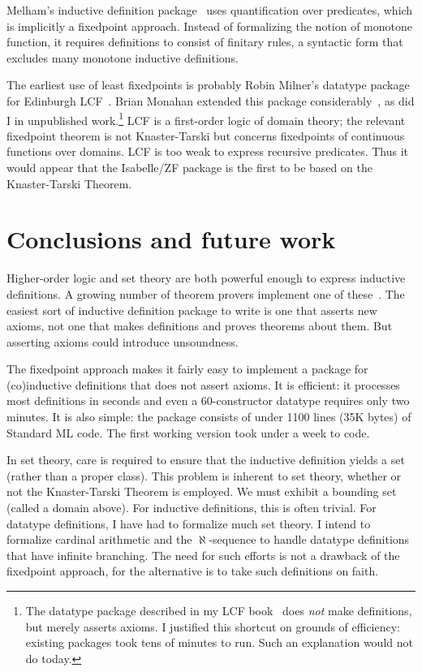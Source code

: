 Melham's inductive definition package~\cite{camilleri92} uses
quantification over predicates, which is implicitly a fixedpoint approach.
Instead of formalizing the notion of monotone function, it requires
definitions to consist of finitary rules, a syntactic form that excludes
many monotone inductive definitions.

The earliest use of least fixedpoints is probably Robin Milner's datatype
package for Edinburgh LCF~\cite{milner-ind}.  Brian Monahan extended this
package considerably~\cite{monahan84}, as did I in unpublished
work.\footnote{The datatype package described in my LCF
  book~\cite{paulson87} does {\it not\/} make definitions, but merely
  asserts axioms.  I justified this shortcut on grounds of efficiency:
  existing packages took tens of minutes to run.  Such an explanation would
  not do today.}
LCF is a first-order logic of domain theory; the relevant fixedpoint
theorem is not Knaster-Tarski but concerns fixedpoints of continuous
functions over domains.  LCF is too weak to express recursive predicates.
Thus it would appear that the Isabelle/ZF package is the first to be based
on the Knaster-Tarski Theorem.


\section{Conclusions and future work}
Higher-order logic and set theory are both powerful enough to express
inductive definitions.  A growing number of theorem provers implement one
of these~\cite{IMPS,saaltink-fme}.  The easiest sort of inductive
definition package to write is one that asserts new axioms, not one that
makes definitions and proves theorems about them.  But asserting axioms
could introduce unsoundness.

The fixedpoint approach makes it fairly easy to implement a package for
(co)inductive definitions that does not assert axioms.  It is efficient: it
processes most definitions in seconds and even a 60-constructor datatype
requires only two minutes.  It is also simple: the package consists of
under 1100 lines (35K bytes) of Standard ML code.  The first working
version took under a week to code.

In set theory, care is required to ensure that the inductive definition
yields a set (rather than a proper class).  This problem is inherent to set
theory, whether or not the Knaster-Tarski Theorem is employed.  We must
exhibit a bounding set (called a domain above).  For inductive definitions,
this is often trivial.  For datatype definitions, I have had to formalize
much set theory.  I intend to formalize cardinal arithmetic and the
$\aleph$-sequence to handle datatype definitions that have infinite
branching.  The need for such efforts is not a drawback of the fixedpoint
approach, for the alternative is to take such definitions on faith.

